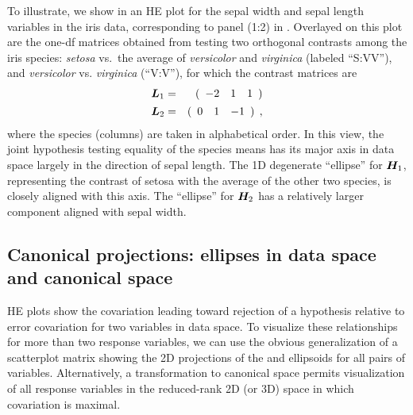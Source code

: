To illustrate, we show in  an HE plot for the sepal width and sepal length variables in the iris data,
corresponding to panel (1:2) in . Overlayed on this plot are the
one-df  matrices obtained from testing two orthogonal contrasts among the iris species:
\emph{setosa} vs.\ the average of \emph{versicolor} and \emph{virginica} (labeled ``S:VV''), and \emph{versicolor} vs. \emph{virginica} (``V:V''), for which the contrast matrices are
\begin{eqnarray*}
\bm{L}_1 & = &
( \begin{array}{rrr}
-2 & 1 & 1
\end{array} )
\\
\bm{L}_2 & = &
( \begin{array}{rrr}
0 & 1 & -1
\end{array} ) \:\: ,
\end{eqnarray*}
where the species (columns) are taken in alphabetical order. In this view, the joint hypothesis testing
equality of the species means has its major axis in data space largely in the direction of sepal length.
The 1D degenerate ``ellipse'' for $\bm{H}_1$, representing the contrast of setosa with the average of the other two species,
is closely aligned with this axis. The ``ellipse'' for $\bm{H}_2$ has a relatively larger component aligned
with sepal width.

\subsection{Canonical projections: ellipses in data space and canonical space}

HE plots show the covariation leading toward rejection of a hypothesis relative to
error covariation for two variables in data space. To visualize these relationships for more than two
response variables, we can use the obvious generalization of a scatterplot matrix showing the 2D
projections of the  and  ellipsoids for all pairs of variables.
Alternatively, a transformation to canonical space permits visualization of all response variables
in the reduced-rank 2D (or 3D) space in which  covariation is maximal.


